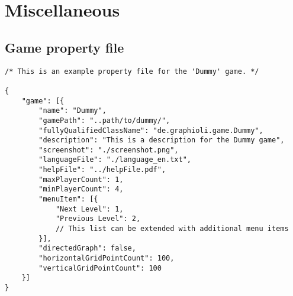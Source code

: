 \section{Miscellaneous}
\subsection{Game property file}

\begin{lstlisting}[caption=An example of a property file.]
/* This is an example property file for the 'Dummy' game. */

{
    "game": [{
        "name": "Dummy",
        "gamePath": "..path/to/dummy/",
        "fullyQualifiedClassName": "de.graphioli.game.Dummy",
        "description": "This is a description for the Dummy game",
        "screenshot": "./screenshot.png",
        "languageFile": "./language_en.txt",
        "helpFile": "../helpFile.pdf",
        "maxPlayerCount": 1,
        "minPlayerCount": 4,
        "menuItem": [{
            "Next Level": 1,
            "Previous Level": 2,
            // This list can be extended with additional menu items
        }],
        "directedGraph": false,
        "horizontalGridPointCount": 100,
        "verticalGridPointCount": 100
    }]
}
\end{lstlisting}
